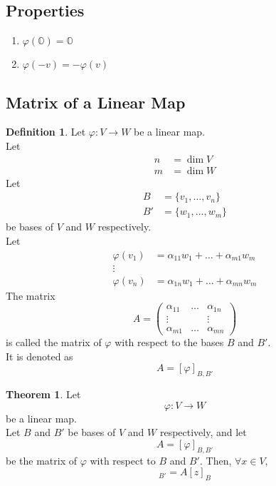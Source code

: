 \documentclass[fleqn, a4paper, 12pt]{article}
\theoremstyle{definition}
\newtheorem{definition}{Definition} %
\theoremstyle{theorem}
\newtheorem{theorem}{Theorem} %
\theoremstyle{remark}
\numberwithin{equation}{theorem}
\begin{document}
\subsection{Properties}

\begin{enumerate}
	\item $\varphi (\mathbb{O}) = \mathbb{O}$
	\item $\varphi (-v) = - \varphi (v)$
\end{enumerate}

\subsection{Matrix of a Linear Map}

\begin{definition}
	Let $\varphi : V \to W$ be a linear map.\\
	Let
	\begin{align*}
		n &= \dim V\\
		m &= \dim W
	\end{align*}
	Let
	\begin{align*}
		B &= \{v_1, \dots, v_n\}\\
		B' &= \{w_1, \dots, w_m\}
	\end{align*}
	be bases of $V$ and $W$ respectively.\\
	Let 
	\begin{align*}
		\varphi (v_1) &= \alpha_{11} w_{1} + \dots + \alpha_{m1} w_{m}\\
		\vdots\\
		\varphi (v_n) &= \alpha_{1n} w_{1} + \dots + \alpha_{mn} w_{m}
	\end{align*}
	The matrix
	\begin{equation*}
		A = 
		\begin{pmatrix}
			\alpha_{11} & \dots & \alpha_{1n}\\
			\vdots & & \vdots\\
			\alpha_{m1} & \dots & \alpha_{mn}
		\end{pmatrix}
	\end{equation*}
	is called the matrix of $\varphi$ with respect to the bases $B$ and $B'$.\\
	It is denoted as
	\begin{equation*}
		A = [\varphi]_{B, B'}
	\end{equation*}
\end{definition}

\begin{theorem}
	Let 
	\begin{equation*}
		\varphi : V \to W
	\end{equation*}
	be a linear map.\\
	Let $B$ and $B'$ be bases of $V$ and $W$ respectively, and let 
	\begin{equation*}
		A = [\varphi]_{B, B'}
	\end{equation*}
	be the matrix of $\varphi$ with respect to $B$ and $B'$. Then, $\forall x \in V$,
	\begin{equation*}
		[\varphi(z)]_{B'} = A [z]_B
	\end{equation*}
\end{theorem}
\end{document}
